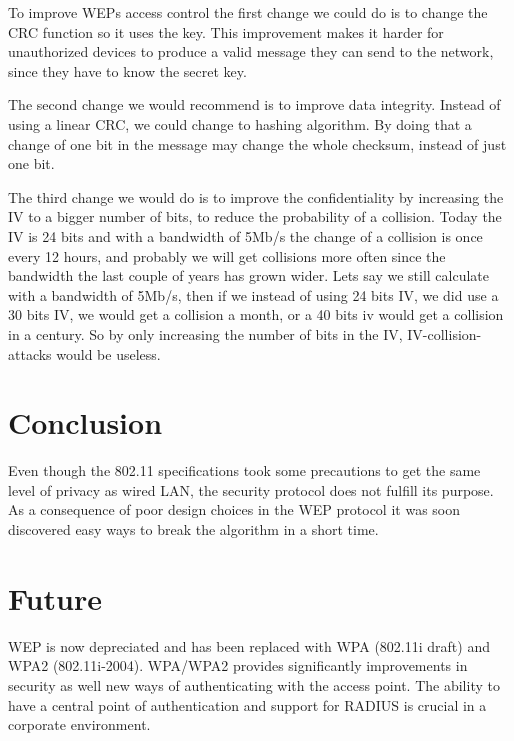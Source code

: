 \documentclass[twocolumn,11pt]{IEEEtran}
\begin{document}
To improve WEPs access control the first change we could do is to change the CRC function so it uses the key. This improvement makes it harder for unauthorized devices to produce a valid message they can send to the network, since they have to know the secret key. 

The second change we would recommend is to improve data integrity. Instead of using a linear CRC, we could change to hashing algorithm. By doing that a change of one bit in the message may change the whole checksum, instead of just one bit. 

The third change we would do is to improve the confidentiality by increasing the IV to a bigger number of bits, to reduce the probability of a collision. Today the IV is 24 bits and with a bandwidth of 5Mb/s the change of a collision is once every 12 hours, and probably we will get collisions more often since the bandwidth the last couple of years has grown wider. Lets say we still calculate with a bandwidth of 5Mb/s, then if we instead of using 24 bits IV, we did use a 30 bits IV, we would get a collision a month, or a 40 bits iv would get a collision in a century. So by only increasing the number of bits in the IV, IV-collision-attacks would be useless.

\section {Conclusion}
\label{sec:conclusion}

Even though the 802.11 specifications took some precautions to get the same level of privacy as wired LAN, the security protocol does not fulfill its purpose. As a consequence of poor design choices in the WEP protocol it was soon discovered easy ways to break the algorithm in a short time. 

\section {Future}
\label{sec:future}

WEP is now depreciated and has been replaced with WPA (802.11i draft) and WPA2 (802.11i-2004). WPA/WPA2 provides significantly improvements in security as well new ways of authenticating with the access point. The ability to have a central point  of authentication and support for RADIUS is crucial in a corporate environment.





\end{document}
